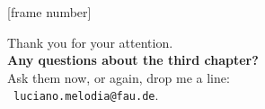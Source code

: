 \documentclass[aspectratio=169,t]{beamer}
\begin{document}
  { %
    [frame number]
    \begin{frame}[c]
      \begin{center}
        Thank you for your attention.\\
        {\bf Any questions about the third chapter?}\\[0.5cm]
        Ask them now, or again, drop me a line: \\
        \faSendO \ \texttt{luciano.melodia@fau.de}.
      \end{center}
    \end{frame}
  }
\end{document}
